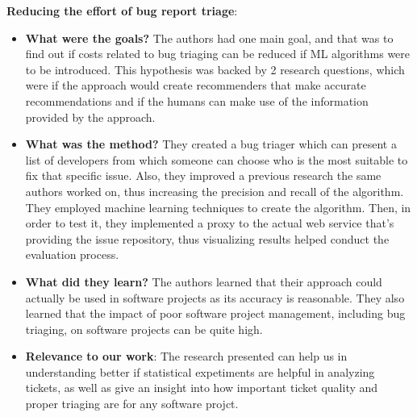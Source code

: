 \documentclass{mprop}
\begin{document}
\textbf{Reducing the effort of bug report triage}\cite{anvik2011reducing}:
\begin{itemize}
  \item \textbf{What were the goals?}
  The authors had one main goal, and that was to find out if costs related to bug triaging can be reduced if ML algorithms were to be introduced. This hypothesis was backed by 2 research questions, which were if the approach would create recommenders that make accurate recommendations and if the humans can make use of the information provided by the approach. 
  \item \textbf{What was the method?}
  They created a bug triager which can present a list of developers from which someone can choose who is the most suitable to fix that specific issue. Also, they improved a previous research the same authors worked on, thus increasing the precision and recall of the algorithm. They employed machine learning techniques to create the algorithm. Then, in order to test it, they implemented a proxy to the actual web service that’s providing the issue repository, thus visualizing results helped conduct the evaluation process.
  \item \textbf{What did they learn?}
  The authors learned that their approach could actually be used in software projects as its accuracy is reasonable. They also learned that the impact of poor software project management, including bug triaging, on software projects can be  quite high.
  \item \textbf{Relevance to our work}:
  The research presented can help us in understanding better if statistical expetiments are helpful in analyzing tickets, as well as give an insight into how important ticket quality and proper triaging are for any software projct. 
\end{itemize}
\end{document}
